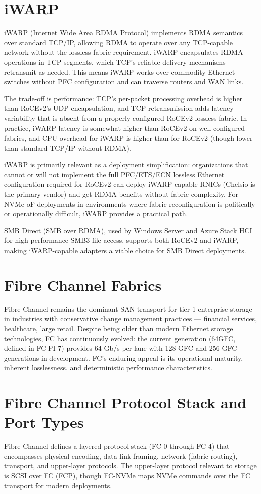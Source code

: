 \section{iWARP}
iWARP (Internet Wide Area RDMA Protocol) implements RDMA semantics over standard TCP/IP, allowing RDMA to operate over any TCP-capable network without the lossless fabric requirement. iWARP encapsulates RDMA operations in TCP segments, which TCP's reliable delivery mechanisms retransmit as needed. This means iWARP works over commodity Ethernet switches without PFC configuration and can traverse routers and WAN links.

The trade-off is performance: TCP's per-packet processing overhead is higher than RoCEv2's UDP encapsulation, and TCP retransmission adds latency variability that is absent from a properly configured RoCEv2 lossless fabric. In practice, iWARP latency is somewhat higher than RoCEv2 on well-configured fabrics, and CPU overhead for iWARP is higher than for RoCEv2 (though lower than standard TCP/IP without RDMA).

iWARP is primarily relevant as a deployment simplification: organizations that cannot or will not implement the full PFC/ETS/ECN lossless Ethernet configuration required for RoCEv2 can deploy iWARP-capable RNICs (Chelsio is the primary vendor) and get RDMA benefits without fabric complexity. For NVMe-oF deployments in environments where fabric reconfiguration is politically or operationally difficult, iWARP provides a practical path.

SMB Direct (SMB over RDMA), used by Windows Server and Azure Stack HCI for high-performance SMB3 file access, supports both RoCEv2 and iWARP, making iWARP-capable adapters a viable choice for SMB Direct deployments.

\section{Fibre Channel Fabrics}
Fibre Channel remains the dominant SAN transport for tier-1 enterprise storage in industries with conservative change management practices --- financial services, healthcare, large retail. Despite being older than modern Ethernet storage technologies, FC has continuously evolved: the current generation (64GFC, defined in FC-PI-7) provides 64 Gb/s per lane with 128 GFC and 256 GFC generations in development. FC's enduring appeal is its operational maturity, inherent losslessness, and deterministic performance characteristics.

\section{Fibre Channel Protocol Stack and Port Types}
Fibre Channel defines a layered protocol stack (FC-0 through FC-4) that encompasses physical encoding, data-link framing, network (fabric routing), transport, and upper-layer protocols. The upper-layer protocol relevant to storage is SCSI over FC (FCP), though FC-NVMe maps NVMe commands over the FC transport for modern deployments.

